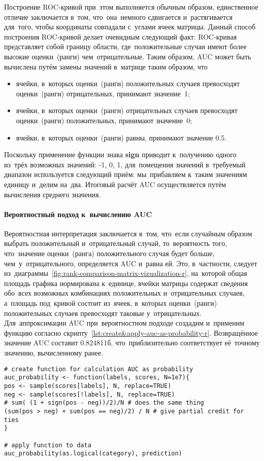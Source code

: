 \documentclass[]{scrreprt}
\begin{document}
Построение ROC-кривой при~этом выполняется обычным образом, единственное отличие заключается в~том, что~она~немного сдвигается и~растягивается для~того, чтобы координаты совпадали с~углами ячеек матрицы. Данный способ построения ROC-кривой делает очевидным следующий факт: ROC-кривая представляет собой границу области, где~положительные случаи имеют более высокие оценки~(ранги) чем~отрицательные. Таким образом, AUC может быть вычислена путём замены значений в~матрице таким образом, что
\begin{itemize}
	\item ячейки, в~которых оценки~(ранги) положительных случаев превосходят оценки~(ранги) отрицательных, принимают значение~1;
	\item ячейки, в~которых оценки~(ранги) отрицательных случаев превосходят оценки~(ранги) положительных, принимают значение~0;
	\item ячейки, в~которых оценки~(ранги) равны, принимают значение 0.5.
\end{itemize}
Поскольку применение функции знака \textbf{sign} приводит к~получению одного из~трёх возможных значений: -1, 0, 1, для~помещения значений в~требуемый диапазон используется следующий приём: мы~прибавляем к~таким значениям единицу и~делим на~два. Итоговый расчёт AUC осуществляется путём вычисления среднего значения.

\paragraph{Вероятностный подход к~вычислению AUC}
Вероятностная интерпретация заключается в~том, что~если случайным образом выбрать положительный и~отрицательный случай, то~вероятность того, что~значение оценки~(ранга) положительного случая будет больше, чем~у~отрицательного, определяется AUC и~равна ей. Это, в~частности, следует из~диаграммы~\ref{fig:rank-comparison-matrix-vizualization-r}, на~которой общая площадь графика нормирована к~единице, ячейки матрицы содержат сведения обо~всех возможных комбинациях положительных и~отрицательных случаев, а~площадь под~кривой состоит из~ячеек, в~которых оценки~(ранги) положительных случаев превосходят таковые у~отрицательных. Для~аппроксимации AUC при~вероятностном подходе создадим и~применим функцию согласно скрипту~\ref{lst:create&apply-auc-as-probability-r}. Возвращённое значение AUC составит 0.824811б, что~приблизительно соответствует её~точному значению, вычисленному ранее. 
%
\begin{lstlisting}[float, caption = Создание и~применение функции для~вычисления AUC как вероятности, firstnumber=1, label= lst:create&apply-auc-as-probability-r]
# create function for calculation AUC as probability
auc_probability <- function(labels, scores, N=1e7){
pos <- sample(scores[labels], N, replace=TRUE)
neg <- sample(scores[!labels], N, replace=TRUE)
# sum( (1 + sign(pos - neg))/2)/N # does the same thing
(sum(pos > neg) + sum(pos == neg)/2) / N # give partial credit for ties
}

# apply function to data
auc_probability(as.logical(category), prediction)
\end{lstlisting}
%
\end{document}
